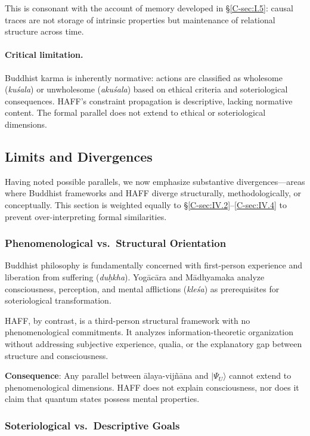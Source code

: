 \documentclass[12pt,a4paper,openany]{book}
\begin{document}
This is consonant with the account of memory developed in §\ref{C-sec:I.5}: causal traces are not storage of intrinsic properties but maintenance of relational structure across time.

\paragraph{Critical limitation.}
Buddhist karma is inherently normative: actions are classified as wholesome (\emph{kuśala}) or unwholesome (\emph{akuśala}) based on ethical criteria and soteriological consequences. HAFF's constraint propagation is descriptive, lacking normative content. The formal parallel does not extend to ethical or soteriological dimensions.

\subsection{Limits and Divergences}
\label{C-sec:IV.5}

Having noted possible parallels, we now emphasize substantive divergences—areas where Buddhist frameworks and HAFF diverge structurally, methodologically, or conceptually. This section is weighted equally to §\ref{C-sec:IV.2}--\ref{C-sec:IV.4} to prevent over-interpreting formal similarities.

\subsubsection{Phenomenological vs.\ Structural Orientation}

Buddhist philosophy is fundamentally concerned with first-person experience and liberation from suffering (\emph{du\d{h}kha}). Yog\=ac\=ara and M\=adhyamaka analyze consciousness, perception, and mental afflictions (\emph{kleśa}) as prerequisites for soteriological transformation.

HAFF, by contrast, is a third-person structural framework with no phenomenological commitments. It analyzes information-theoretic organization without addressing subjective experience, qualia, or the explanatory gap between structure and consciousness.

\textbf{Consequence}: Any parallel between \=alaya-vijñ\=ana and $|\Psi_U\rangle$ cannot extend to phenomenological dimensions. HAFF does not explain consciousness, nor does it claim that quantum states possess mental properties.

\subsubsection{Soteriological vs.\ Descriptive Goals}
\end{document}
